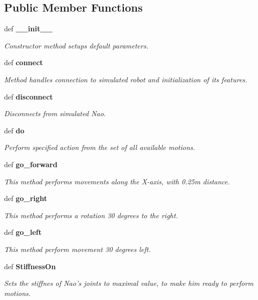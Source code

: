 \subsection*{Public Member Functions}
\begin{DoxyCompactItemize}
\item 
def {\bf \+\_\+\+\_\+init\+\_\+\+\_\+}\label{a00003_ac775ee34451fdfa742b318538164070e}

\begin{DoxyCompactList}\small\item\em Constructor method setups default parameters. \end{DoxyCompactList}\item 
def {\bf connect}
\begin{DoxyCompactList}\small\item\em Method handles connection to simulated robot and initialization of its features. \end{DoxyCompactList}\item 
def {\bf disconnect}\label{a00003_afab97b4023d6e30d95344406b3655983}

\begin{DoxyCompactList}\small\item\em Disconnects from simulated Nao. \end{DoxyCompactList}\item 
def {\bf do}
\begin{DoxyCompactList}\small\item\em Perform specified action from the set of all available motions. \end{DoxyCompactList}\item 
def {\bf go\+\_\+forward}\label{a00003_a74f88e9c727035ad050d4a1b5e16eb5f}

\begin{DoxyCompactList}\small\item\em This method performs movements along the X-\/axis, with 0.\+25m distance. \end{DoxyCompactList}\item 
def {\bf go\+\_\+right}\label{a00003_a1825cf4236b693f347db9c793206049c}

\begin{DoxyCompactList}\small\item\em This method performs a rotation 30 degrees to the right. \end{DoxyCompactList}\item 
def {\bf go\+\_\+left}\label{a00003_a3661eec663302a3b67351833c2c9b8de}

\begin{DoxyCompactList}\small\item\em This method perform movement 30 degrees left. \end{DoxyCompactList}\item 
def {\bf Stiffness\+On}
\begin{DoxyCompactList}\small\item\em Sets the stiffnes of Nao's joints to maximal value, to make him ready to perform motions. \end{DoxyCompactList}\end{DoxyCompactItemize}
